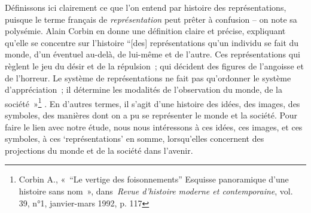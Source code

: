 \documentclass[letterpaper,portrait,12pt]{article}
\begin{document}
	D\'{e}finissons ici clairement ce que l'on entend par histoire des repr\'{e}sentations, puisque le terme fran\c{c}ais de \emph{repr\'{e}sentation} peut pr\^{e}ter \`{a} confusion -- on note sa polys\'{e}mie.  Alain Corbin en donne une d\'{e}finition claire et pr\'{e}cise, expliquant qu'elle se concentre sur l'histoire {``}[des] repr\'{e}sentations qu'un individu se fait du monde, d'un \'{e}ventuel au-del\`{a}, de lui-m\^{e}me et de l'autre. Ces repr\'{e}sentations qui r\`{e}glent le jeu du d\'{e}sir et de la r\'{e}pulsion ; qui d\'{e}cident des figures de l'angoisse et de l'horreur. Le syst\`{e}me de repr\'{e}sentations ne fait pas qu'ordonner le syst\`{e}me d'appr\'{e}ciation ; il d\'{e}termine les modalit\'{e}s de l'observation du monde, de la soci\'{e}t\'{e} »\footnote{	Corbin A., « {``}Le vertige des foisonnements'' Esquisse panoramique d'une histoire sans nom », dans \emph{Revue d'histoire moderne et contemporaine}, vol. 39, n°1, janvier-mars 1992, p. 117} . En d'autres termes, il s'agit d'une histoire des id\'{e}es, des images, des symboles, des mani\`{e}res dont on a pu se repr\'{e}senter le monde et la soci\'{e}t\'{e}. Pour faire le lien avec notre \'{e}tude, nous nous int\'{e}ressons \`{a} ces id\'{e}es, ces images, et  ces symboles, \`{a} ces {`}repr\'{e}sentations' en somme, lorsqu'elles concernent des projections du monde et de la soci\'{e}t\'{e} dans l'avenir.
\end{document}
